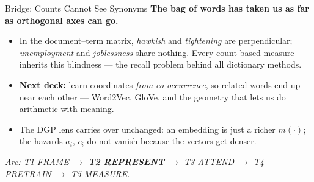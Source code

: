 \begin{frame}{Bridge: Counts Cannot See Synonyms}
\textbf{The bag of words has taken us as far as orthogonal axes can go.}
\begin{itemize}
\item In the document--term matrix, \emph{hawkish} and \emph{tightening} are perpendicular; \emph{unemployment} and \emph{joblessness} share nothing. Every count-based measure inherits this blindness --- the recall problem behind all dictionary methods.
\item \textbf{Next deck:} learn coordinates \emph{from co-occurrence}, so related words end up near each other --- Word2Vec, GloVe, and the geometry that lets us do arithmetic with meaning.
\item The DGP lens carries over unchanged: an embedding is just a richer $m(\cdot)$; the hazards $a_i$, $c_i$ do not vanish because the vectors get denser.
\end{itemize}
\bigskip
\centering\footnotesize\textit{Arc: T1 FRAME $\to$ \textbf{T2 REPRESENT} $\to$ T3 ATTEND $\to$ T4 PRETRAIN $\to$ T5 MEASURE.}
\end{frame}


